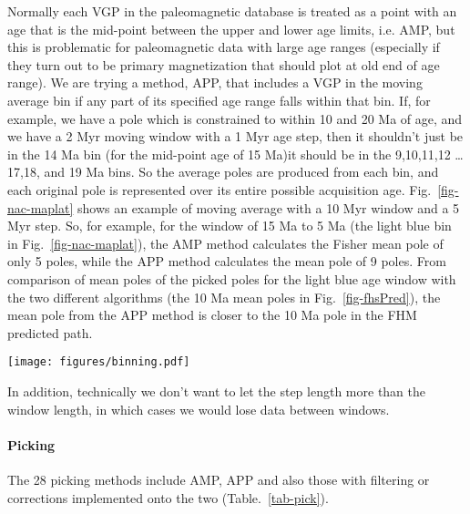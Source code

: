Normally each VGP in the paleomagnetic database is treated as a point with an
age that is the mid-point between the upper and lower age limits, i.e. AMP, but
this is problematic for paleomagnetic data with large age ranges (especially if
they turn out to be primary magnetization that should plot at old end of age
range). We are trying a method, APP, that includes a VGP in the moving average
bin if any part of its specified age range falls within that bin. If, for
example, we have a pole which is constrained to within 10 and 20 Ma of age, and
we have a 2 Myr moving window with a 1 Myr age step, then it shouldn't just be
in the 14 Ma bin (for the mid-point age of 15 Ma)\textemdash{}it
should be in the 9,10,11,12
\ldots17,18, and 19 Ma bins. So the
average poles are produced from each bin, and each original pole is represented
over its entire possible acquisition age. Fig.~\ref{fig-nac-maplat} shows an
example of moving average with a 10 Myr window and a 5 Myr step. So, for
example, for the window of 15 Ma to 5 Ma (the light blue bin in
Fig.~\ref{fig-nac-maplat}), the AMP method calculates the Fisher mean pole of
only 5 poles, while the APP method calculates the mean pole of 9 poles. From
comparison of mean poles of the picked poles for the light blue age window with
the two different algorithms (the 10 Ma mean poles in Fig.~\ref{fig-fhsPred}),
the mean pole from the APP method is closer to the 10 Ma pole in the FHM
predicted path.

\begin{figure*}
\centering
\texttt{[image: figures/binning.pdf]}
\caption[Moving average (MA) methods]{An example of 10 Myr moving window and 5
Myr step in the moving average method, based on poles of the $NAC$. Every age
window has a different color. Red points are the midpoints of low and high
magnetic ages. The vertical axis has no specific meaning here.
}\label{fig-nac-maplat}
\end{figure*}

In addition, technically we don't want to let the step length more than the
window length, in which cases we would lose data between windows.

\paragraph{Picking}

The 28 picking methods include AMP, APP and also those with filtering or
corrections implemented onto the two (Table.~\ref{tab-pick}).

